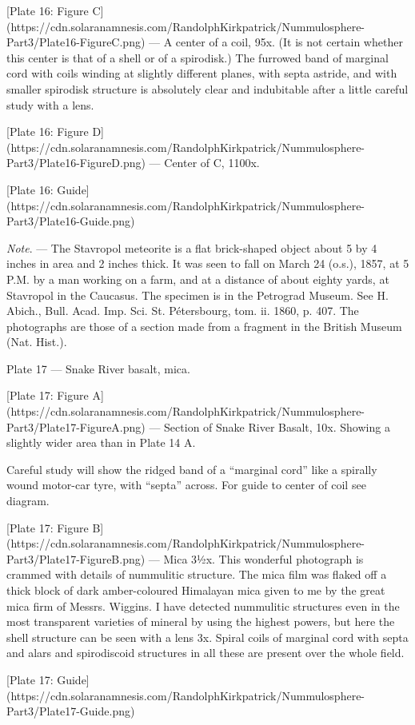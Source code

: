 \documentclass[a4paper, 12pt, oneside]{article}
\begin{document}
[Plate 16: Figure C](https://cdn.solaranamnesis.com/RandolphKirkpatrick/Nummulosphere-Part3/Plate16-FigureC.png) --- A center of a coil, 95x. (It is not certain whether this center is that of a shell or of a spirodisk.) The furrowed band of marginal cord with coils winding at slightly different planes, with septa astride, and with smaller spirodisk structure is absolutely clear and indubitable after a little careful study with a lens.

[Plate 16: Figure D](https://cdn.solaranamnesis.com/RandolphKirkpatrick/Nummulosphere-Part3/Plate16-FigureD.png) --- Center of C, 1100x.

[Plate 16: Guide](https://cdn.solaranamnesis.com/RandolphKirkpatrick/Nummulosphere-Part3/Plate16-Guide.png)

\emph{Note}. --- The Stavropol meteorite is a flat brick-shaped object about 5 by 4 inches in area and 2 inches thick. It was seen to fall on March 24 (o.s.), 1857, at 5 P.M. by a man working on a farm, and at a distance of about eighty yards, at Stavropol in the Caucasus. The specimen is in the Petrograd Museum. See H. Abich., Bull. Acad. Imp. Sci. St. Pétersbourg, tom. ii. 1860, p. 407. The photographs are those of a section made from a fragment in the British Museum (Nat. Hist.).

Plate 17 --- Snake River basalt, mica.

[Plate 17: Figure A](https://cdn.solaranamnesis.com/RandolphKirkpatrick/Nummulosphere-Part3/Plate17-FigureA.png) --- Section of Snake River Basalt, 10x. Showing a slightly wider area than in Plate 14 A.

Careful study will show the ridged band of a ``marginal cord'' like a spirally wound motor-car tyre, with ``septa'' across. For guide to center of coil see diagram.

[Plate 17: Figure B](https://cdn.solaranamnesis.com/RandolphKirkpatrick/Nummulosphere-Part3/Plate17-FigureB.png) --- Mica 3½x. This wonderful photograph is crammed with details of nummulitic structure. The mica film was flaked off a thick block of dark amber-coloured Himalayan mica given to me by the great mica firm of Messrs. Wiggins. I have detected nummulitic structures even in the most transparent varieties of mineral by using the highest powers, but here the shell structure can be seen with a lens 3x. Spiral coils of marginal cord with septa and alars and spirodiscoid structures in all these are present over the whole field.

[Plate 17: Guide](https://cdn.solaranamnesis.com/RandolphKirkpatrick/Nummulosphere-Part3/Plate17-Guide.png)
\end{document}
